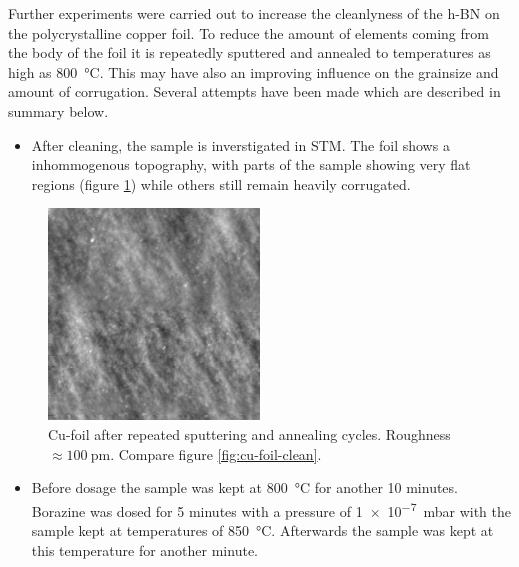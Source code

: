 Further experiments were carried out to increase the cleanlyness of the h-BN on the polycrystalline copper foil. To reduce the amount of elements coming from the body of the foil it is repeatedly sputtered and annealed to temperatures as high as \SI{800}{\degreeCelsius}. This may have also an improving influence on the grainsize and amount of corrugation. Several attempts have been made which are described in summary below.
\begin{itemize}
 \item After cleaning, the sample is inverstigated in STM. The foil shows a inhommogenous topography, with parts of the sample showing very flat regions (figure \ref{fig:30-31.03}) while others still remain heavily corrugated.
\end{itemize}
\begin{figure}[h!]
 \centering
 \includegraphics[width=0.5\textwidth]{./images/F150331-124839.jpg}
 \caption{Cu-foil after repeated sputtering and annealing cycles. Roughness $\approx \SI{100}{\pico\meter}$. Compare figure \ref{fig:cu-foil-clean}.}
 \label{fig:30-31.03}
\end{figure}
\begin{itemize}
 \item Before dosage the sample was kept at \SI{800}{\degreeCelsius} for another 10 minutes.
Borazine was dosed for 5 minutes with a pressure of \SI{1e-7}{\milli \bar} with the sample kept at temperatures of \SI{850}{\degreeCelsius}. Afterwards the sample was kept at this temperature for another minute.
\end{itemize}
